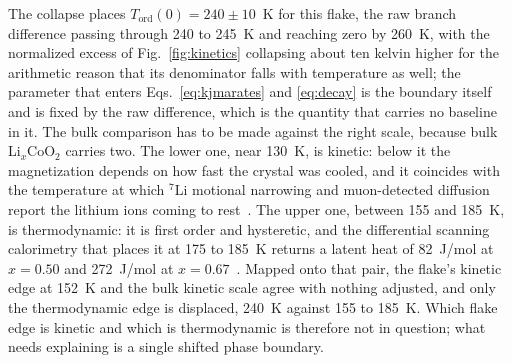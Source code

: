 \documentclass[reprint,twocolumn,prb,amsmath,amssymb,superscriptaddress,floatfix]{revtex4-2}
\newcommand{\Tcol}{T_{\mathrm{ord}}}
\begin{document}
The collapse places $\Tcol(0)=240\pm10$~K for this flake, the raw branch difference passing
through 240 to 245~K and reaching zero by 260~K, with the normalized excess of
Fig.~\ref{fig:kinetics} collapsing about ten kelvin higher for the arithmetic reason that its
denominator falls with temperature as well; the parameter that enters
Eqs.~\eqref{eq:kjmarates} and \eqref{eq:decay} is the boundary itself and is fixed by the raw
difference, which is the quantity that carries no baseline in it. The bulk comparison has to be
made against the right scale, because bulk Li$_x$CoO$_2$ carries two. The lower one, near 130~K, is
kinetic: below it the magnetization depends on how fast the crystal was cooled, and it coincides
with the temperature at which $^{7}$Li motional narrowing and muon-detected diffusion report the
lithium ions coming to rest~\cite{Miyoshi2010,Nakamura2006,Sugiyama2009}. The upper one, between
155 and 185~K, is thermodynamic: it is first order and hysteretic, and the differential scanning
calorimetry that places it at 175 to 185~K returns a latent heat of 82~J/mol at $x=0.50$ and
272~J/mol at $x=0.67$~\cite{Motohashi2009}.
Mapped onto that pair, the flake's kinetic edge at 152~K and the bulk kinetic scale agree with
nothing adjusted, and only the thermodynamic edge is displaced, 240~K against 155 to 185~K. Which
flake edge is kinetic and which is thermodynamic is therefore not in question; what needs
explaining is a single shifted phase boundary.
\end{document}
